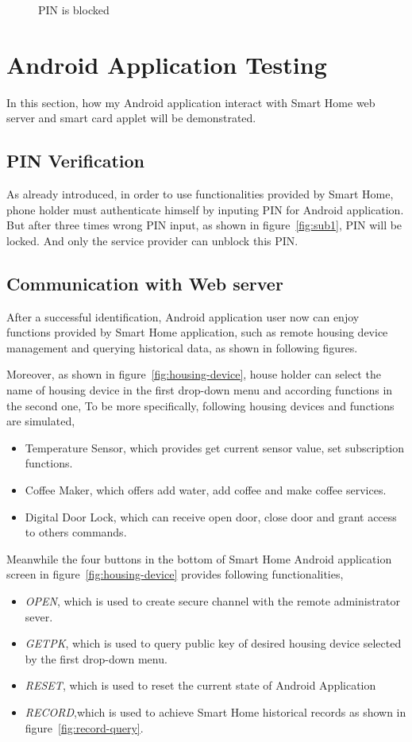 \begin{figure}[!htb]
\begin{minipage}{0.49\linewidth}
  \caption{PIN is blocked}
  \label{fig:sub2}
\end{minipage}
  \end{figure}
\section{Android Application Testing}
In this section, how my Android application interact with Smart Home web server and smart card applet will be demonstrated.

\subsection{PIN Verification}

As already introduced, in order to use functionalities provided by Smart Home, phone holder must authenticate himself by inputing PIN for Android application. But after three times wrong PIN input, as shown in figure~\ref{fig:sub1}, PIN will be locked. And only the service provider can unblock this PIN. 
\subsection{Communication with Web server}
After a successful identification, Android application user now can enjoy functions provided by Smart Home application, such as remote housing device management and querying historical data, as shown in following figures.

Moreover, as shown in figure~\ref{fig:housing-device}, house holder can select the name of housing device in the first drop-down menu and  according functions in the second one, To be more specifically, following housing devices and functions are simulated,
\begin{itemize}
\item Temperature Sensor, which provides get current sensor value, set subscription functions.
\item Coffee Maker,  which offers add water, add coffee and make coffee services.
\item Digital Door Lock, which can receive  open door, close door and  grant  access  to  others commands.
\end{itemize}

Meanwhile the four buttons in the bottom of  Smart Home Android application screen in figure~\ref{fig:housing-device} provides  following functionalities,
\begin{itemize}
\item \emph{OPEN}, which is used to create secure  channel with  the remote administrator sever.
\item \emph{GETPK}, which is used to query public key of desired housing device selected  by the first drop-down menu.
\item \emph{RESET}, which is used to reset the current state of Android Application
\item \emph{RECORD},which is used to achieve Smart Home historical records as shown in figure~\ref{fig:record-query}.
\end{itemize}


